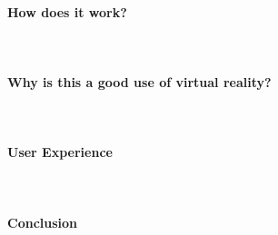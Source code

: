 \documentclass[11pt]{article}
\begin{document}
\paragraph{How does it work?} ~ \par 

\paragraph{Why is this a good use of virtual reality?} ~ \par 

\paragraph{User Experience} ~ \par  

\paragraph{Conclusion} ~ \par 

\newpage


\end{document}
